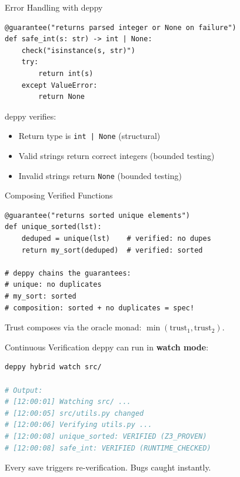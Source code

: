 \documentclass[aspectratio=169,11pt]{beamer}
\begin{document}
\begin{frame}{Error Handling with deppy}
\begin{lstlisting}[language=deppy, basicstyle=\small\ttfamily]
@guarantee("returns parsed integer or None on failure")
def safe_int(s: str) -> int | None:
    check("isinstance(s, str)")
    try:
        return int(s)
    except ValueError:
        return None
\end{lstlisting}

\vspace{0.5em}
deppy verifies:
\begin{itemize}
\item Return type is \texttt{int | None} (structural)
\item Valid strings return correct integers (bounded testing)
\item Invalid strings return \texttt{None} (bounded testing)
\end{itemize}
\end{frame}

\begin{frame}{Composing Verified Functions}
\begin{lstlisting}[language=deppy, basicstyle=\small\ttfamily]
@guarantee("returns sorted unique elements")
def unique_sorted(lst):
    deduped = unique(lst)    # verified: no dupes
    return my_sort(deduped)  # verified: sorted

# deppy chains the guarantees:
# unique: no duplicates
# my_sort: sorted
# composition: sorted + no duplicates = spec!
\end{lstlisting}

\vspace{0.3em}
Trust composes via the oracle monad: $\min(\text{trust}_1, \text{trust}_2)$.
\end{frame}

\begin{frame}{Continuous Verification}
deppy can run in \textbf{watch mode}:

\begin{lstlisting}[language=bash, basicstyle=\small\ttfamily]
deppy hybrid watch src/

# Output:
# [12:00:01] Watching src/ ...
# [12:00:05] src/utils.py changed
# [12:00:06] Verifying utils.py ...
# [12:00:08] unique_sorted: VERIFIED (Z3_PROVEN)
# [12:00:08] safe_int: VERIFIED (RUNTIME_CHECKED)
\end{lstlisting}

\vspace{0.5em}
Every save triggers re-verification. Bugs caught instantly.
\end{frame}
\end{document}
